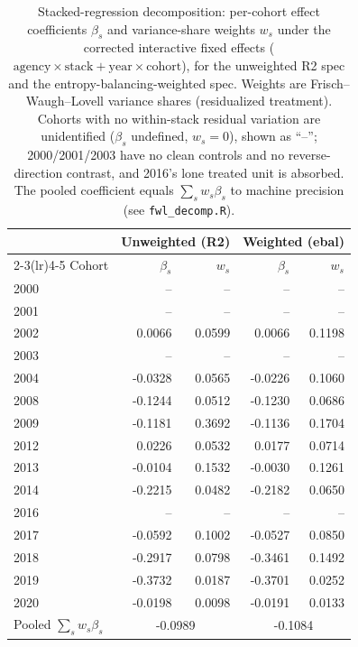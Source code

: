 \begin{table}[t]\centering
\caption{Stacked-regression decomposition: per-cohort effect coefficients
$\beta_s$ and variance-share weights $w_s$ under the corrected interactive
fixed effects ($\text{agency}\times\text{stack}+\text{year}\times\text{cohort}$),
for the unweighted R2 spec and the entropy-balancing-weighted spec. Weights are
Frisch--Waugh--Lovell variance shares (residualized treatment). Cohorts with no
within-stack residual variation are unidentified ($\beta_s$ undefined, $w_s=0$),
shown as ``--''; 2000/2001/2003 have no clean controls and no reverse-direction
contrast, and 2016's lone treated unit is absorbed. The pooled coefficient equals
$\sum_s w_s\beta_s$ to machine precision (see \texttt{fwl\_decomp.R}).}
\label{tab:decomp}\label{tab:stack_decomp}
\begin{tabular}{lrrrr}
\toprule
& \multicolumn{2}{c}{Unweighted (R2)} & \multicolumn{2}{c}{Weighted (ebal)} \\
\cmidrule(lr){2-3}\cmidrule(lr){4-5}
Cohort & $\beta_s$ & $w_s$ & $\beta_s$ & $w_s$ \\
\midrule
2000 & -- & -- & -- & -- \\
2001 & -- & -- & -- & -- \\
2002 & 0.0066 & 0.0599 & 0.0066 & 0.1198 \\
2003 & -- & -- & -- & -- \\
2004 & -0.0328 & 0.0565 & -0.0226 & 0.1060 \\
2008 & -0.1244 & 0.0512 & -0.1230 & 0.0686 \\
2009 & -0.1181 & 0.3692 & -0.1136 & 0.1704 \\
2012 & 0.0226 & 0.0532 & 0.0177 & 0.0714 \\
2013 & -0.0104 & 0.1532 & -0.0030 & 0.1261 \\
2014 & -0.2215 & 0.0482 & -0.2182 & 0.0650 \\
2016 & -- & -- & -- & -- \\
2017 & -0.0592 & 0.1002 & -0.0527 & 0.0850 \\
2018 & -0.2917 & 0.0798 & -0.3461 & 0.1492 \\
2019 & -0.3732 & 0.0187 & -0.3701 & 0.0252 \\
2020 & -0.0198 & 0.0098 & -0.0191 & 0.0133 \\
\midrule
Pooled $\sum_s w_s\beta_s$ & \multicolumn{2}{c}{-0.0989} & \multicolumn{2}{c}{-0.1084} \\
\bottomrule
\end{tabular}
\end{table}
